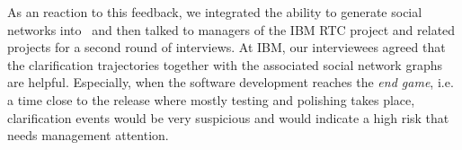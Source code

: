 As an reaction to this feedback, we integrated the ability to generate social networks into \viss\ and then  talked to managers of the IBM RTC project and related projects for a second round of interviews.
At IBM, our interviewees agreed that the clarification trajectories together with the associated social network graphs are helpful. 
Especially, when the software development reaches the \emph{end game}, i.e. a time close to the release where mostly testing and polishing takes place, clarification events would be very suspicious and would indicate a high risk that needs management attention. 
